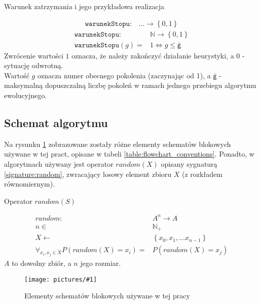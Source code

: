 \documentclass[twoside]{iisthesis}
\newcommand{\numberSet}[1]{\mathbb{#1}}
\newcommand{\param}[1]{\mathtt{#1}}
\newcommand{\variable}[1]{\mathsf{#1}}
\newcommand{\img}[1]{\texttt{[image: pictures/\#1]}}
\begin{document}
\begin{signature}
	\caption{Warunek zatrzymania i jego przykładowa realizacja \label{signature:stop}} 
	\begin{align}
		\label{line:stop_general}
		\param{warunekStopu}: &\ldots \rightarrow \left\{ 0, 1 \right\}
	\end{align}
	\begin{align}
		\label{line:stop_maxGen}
		\param{warunekStopu}: &\numberSet{N} \rightarrow \left\{ 0, 1 \right\} \\
		\param{warunekStopu}(g) = &1 \Leftrightarrow g \leq \overline{\variable{g}}
	\end{align}
	Zwrócenie wartości $1$ oznacza, że należy zakończyć działanie heurystyki, a $0$ - sytuację odwrotną. \\ 
	Wartość $g$ oznacza numer obecnego pokolenia (zaczynając od 1), a $\overline{\variable{g}}$ - maksymalną dopuszczalną liczbę pokoleń w ramach jednego przebiegu algorytmu ewolucyjnego.
\end{signature}	

\subsection{Schemat algorytmu} \label{subsection:general_ea_scheme}

Na rysunku \ref{figure:flowchart_conventions} zobrazowane zostały różne elementy schematów blokowych używane w tej pract, opisane w tabeli \ref{table:flowchart_conventions}. Ponadto, w algorytmach używany jest operator $random(X)$ opisany sygnaturą \ref{signature:random}, zwracający losowy element zbioru $X$ (z rozkładem równomiernym).

\begin{signature}
	\caption{Operator $random(S)$ \label{signature:random}}
	\begin{align}
	random: &A^n \rightarrow A \\
	n \in &\numberSet{N}_{+} \\
	X \gets &\left\{ x_0, x_1, \dots x_{n-1} \right\} \\
	\forall_{x_i, x_j \in X} P(random(X) = x_i) = &P(random(X) = x_j)
	\end{align}
	$A$ to dowolny zbiór, a $n$ jego rozmiar.
\end{signature}

\begin{figure}[H]
	\caption{Elementy schematów blokowych używane w tej pracy \label{figure:flowchart_conventions}}
	\img{conventions.png}
\end{figure}
\end{document}
